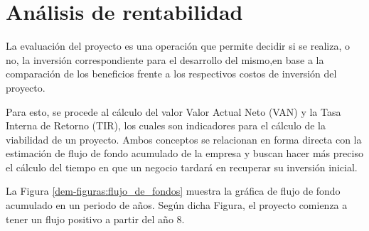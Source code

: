 \section{Análisis de rentabilidad}

La evaluación del proyecto es una operación que permite decidir si se realiza, o no, la inversión correspondiente para el desarrollo del mismo,en base a la comparación de los beneficios frente a los respectivos costos de inversión del proyecto.

Para esto, se procede al cálculo del valor Valor Actual Neto (VAN) y la Tasa Interna de Retorno (TIR), los cuales son indicadores para el cálculo de la viabilidad de un proyecto. Ambos conceptos se relacionan en forma directa con la estimación de flujo de fondo acumulado de la empresa y buscan hacer más preciso el cálculo del tiempo en que un negocio tardará en recuperar su inversión inicial.

La Figura \ref{dem-figuras:flujo_de_fondos} muestra la gráfica de flujo de fondo acumulado en un periodo de  años. Según dicha Figura, el proyecto comienza a tener un flujo positivo a partir del año 8.

